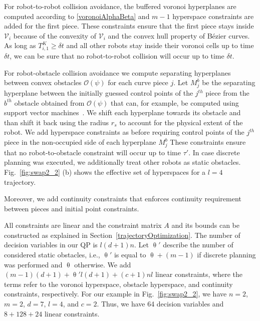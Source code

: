 \documentclass{svproc}
\newcommand{\vP}{\mathbf{P}}
\newcommand{\cV}{\mathcal{V}}
\newcommand{\cO}{\mathcal{O}}
\begin{document}
For robot-to-robot collision avoidance, the buffered voronoi hyperplanes are computed according to \eqref{voronoiAlphaBeta} and $m-1$ hyperspace constraints are added for the first piece.
These constraints ensure that the first piece stays inside $\cV_i$ because of the convexity of $\cV_i$ and the convex hull property of B\'ezier curves.
As long as $T^{K}_{i,1} \geq \delta t$ and all other robots stay inside their voronoi cells up to time $\delta t$, we can be sure that no robot-to-robot collision will occur up to time $\delta t$.

For robot-obstacle collision avoidance we compute separating hyperplanes between convex obstacles $\cO(\psi)$ for each curve piece $j$.
Let $M_j^b$ be the separating hyperplane between the initially guessed control points of the $j^{th}$ piece from the $b^{th}$ obstacle obtained from $\cO(\psi)$ that can, for example, be computed using support vector machines~\cite{SVM}.
We shift each hyperplane towards its obstacle and than shift it back using the radius $r_s$ to account for the physical extent of the robot.
We add hyperspace constraints as before requiring control points of the $j^{th}$ piece in the non-occupied side of each hyperplane $M_j^b$
These constraints ensure that no robot-to-obstacle constraint will occur up to time $\tau'$.
In case discrete planning was executed, we additionally treat other robots as static obstacles.
Fig.~\ref{fig:swap2_2} (b) shows the effective set of hyperspaces for a $l=4$ trajectory.

Moreover, we add continuity constraints that enforces continuity requirement between pieces and initial point constraints.

All constraints are linear and the constraint matrix $A$ and its bounds can be constructed as explained in Section~\ref{trajectoryOptimization}.
The number of decision variables in our QP is $l(d+1)n$.
Let $\uptheta'$ describe the number of considered static obstacles, i.e., $\uptheta'$ is equal to $\uptheta + (m-1)$ if discrete planning was performed and $\uptheta$ otherwise.
We add $(m-1)(d+1) + \uptheta' l(d+1) + (c+1)nl$ linear constraints, where the terms refer to the voronoi hyperspace, obstacle hyperspace, and continuity constraints, respectively.
For our example in Fig.~\ref{fig:swap2_2}, we have $n=2$, $m=2$, $d=7$, $l=4$, and $c=2$. Thus, we have 64 decision variables and $8 + 128 + 24$ linear constraints.
\end{document}
